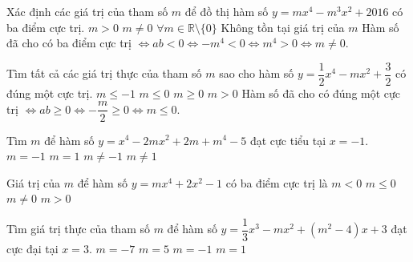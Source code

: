 \begin{ex}%
	Xác định các giá trị của tham số $m$ để đồ thị hàm số $y=mx^4-m^3x^2+2016$ có ba điểm cực trị.
	\choice
	{$m>0$}
	{$m\neq 0$}
	{\True $\forall m\in\mathbb{R}\setminus\{0\}$}
	{Không tồn tại giá trị của $m$}
\loigiai
{
Hàm số đã cho có ba điểm cực trị $\Leftrightarrow ab<0\Leftrightarrow -m^4<0\Leftrightarrow m^4>0\Leftrightarrow m\neq0$.
}
\end{ex}
\begin{ex}%
	Tìm tất cả các giá trị thực của tham số $m$ sao cho hàm số $y=\dfrac{1}{2}x^4-mx^2+\dfrac{3}{2}$ có đúng một cực trị. 
	\choice
	{$m\leq-1$}
	{\True $m\leq 0$}
	{$m\geq 0$}
	{$m>0$}
\loigiai
{
Hàm số đã cho có đúng một cực trị $\Leftrightarrow ab\geq0 \Leftrightarrow -\dfrac{m}{2}\geq0\Leftrightarrow m\leq0$.
}
\end{ex}
\begin{ex}%
		Tìm $m$ để hàm số $y=x^4-2mx^2+2m+m^4-5$ đạt cực tiểu tại $x=-1$. 
		\choice
		{$m=-1$}
		{\True $m=1$}
		{$m\neq-1$}
		{$m\neq 1$}
	\end{ex}
\begin{ex}%
		Giá trị của $m$ để hàm số $y=mx^4+2x^2-1$ có ba điểm cực trị là 
		\choice
		{\True $m<0$}
		{$m\leq 0$}
		{$m\neq 0$}
		{$m>0$}
	\end{ex}
\begin{ex}%
		Tìm giá trị thực của tham số $m$ để hàm số $y=\dfrac{1}{3}{x^3} - m{x^2} + \left( {{m^2} - 4} \right)x + 3$ đạt cực đại tại $x=3$. 
		\choice
		{$m=-7$}
		{\True $m=5$}
		{$m=-1$}
		{$m=1$}
	\end{ex}
